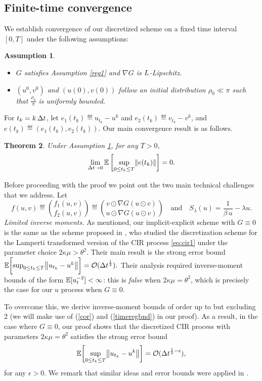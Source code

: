 \documentclass[11pt, twoside]{report}
\newtheorem{theorem}{Theorem}[section]
\newtheorem{assumption}[theorem]{Assumption}
\begin{document}
\subsection{Finite-time convergence}
We  establish convergence  of our discretized scheme on a fixed time interval $[0,T]$ under the following assumptions:
\begin{assumption}\label{reg3} 
\begin{itemize}
    \item[(i)] $G$ satisfies Assumption \ref{reg1} and $\nabla G$ is $L$-Lipschitz.
    \item[(ii)] $(u^0,v^0)$ and $(u(0),v(0))$ follow an initial distribution $\rho_0\ll \pi $ such that $\frac{\rho_0}{\pi}$ is uniformly bounded.
\end{itemize}
\end{assumption}
For $t_k=k\,{\Delta t}$, let  $e_1(t_k) \eqdef u_{t_k} - u^k$ and $e_2(t_k) \eqdef v_{t_k} - v^k$, and $e(t_k) \eqdef (e_1(t_k), e_2(t_k)) $. Our main convergence result is as follows.
\begin{theorem}\label{thm:num_conv}
Under Assumption \ref{reg3}, for any $T>0$,
$$
\lim_{\deltat \to 0} \EE\left[\sup_{0\leq t_k \leq T} \norm{e(t_k)}\right] = 0.
$$
\end{theorem}
Before proceeding with the proof we point out the two main technical challenges that we address. Let 
\begin{equation}\label{eq:f}
    f(u,v) \eqdef \binom{f_1(u,v)}{f_2(u,v)} \eqdef \binom{v\odot \nabla G(u\odot v)}{u\odot \nabla G(u\odot v)}
    \quad \text{and}\quad
    S_\lambda(u) = \frac{1}{\beta\, u} - \lambda u.
\end{equation}
\textit{Limited inverse moments.} As mentioned, our implicit-explicit scheme with $G\equiv 0$ is  the same as the scheme proposed in \cite{Dereich2011-tp}, who studied the discretization scheme for the Lamperti transformed version of the CIR process \eqref{eq:cir1} under the parameter choice $2\kappa\mu>\theta^2$. Their main result is the strong error bound $\EE\biggl[\sup_{0\leq t_k \leq T} \norm{ u_{t_k} - u^k}\biggr] = \Oo(\deltat^{\frac12}).$ Their analysis required inverse-moment bounds of the form $\mathbb{E}[u_t^{-2}]<\infty$: this is \textit{false} when $2\kappa\mu = \theta^2$, which is precisely the case for our $u$ process when $G\equiv 0$. 

To overcome this, we derive inverse-moment bounds of order up to but excluding 2 (we will make use of (\ref{cor}) and (\ref{timeregbnd}) in our proof). As a result, in the case where $G\equiv 0$, our proof shows that the discretized CIR process with parameters $2\kappa\mu =\theta^2$  satisfies the strong error bound $$\EE\biggl[\sup_{0\leq t_k \leq T} \norm{ u_{t_k} - u^k}\biggr] = \Oo(\deltat^{\frac12-\epsilon}),$$  for any $\epsilon>0$. We remark that similar ideas and error bounds were applied in \cite{hutzenthaler2014strong}.
\end{document}
